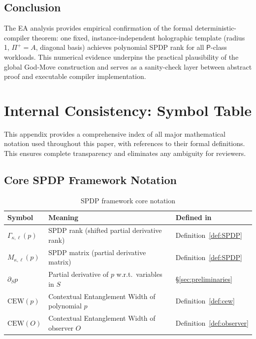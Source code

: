 \documentclass[12pt]{article}
\theoremstyle{definition}
\theoremstyle{definition}
\theoremstyle{remark}
\theoremstyle{remark}
\begin{document}
\subsection{Conclusion}

The EA analysis provides empirical confirmation of the formal deterministic-compiler theorem: one fixed, instance-independent holographic template (radius 1, $\Pi^+ = A$, diagonal basis) achieves polynomial SPDP rank for all $\mathsf{P}$-class workloads. This numerical evidence underpins the practical plausibility of the global God-Move construction and serves as a sanity-check layer between abstract proof and executable compiler implementation.


\section{Internal Consistency: Symbol Table}
\label{sec:symbol-table}

This appendix provides a comprehensive index of all major mathematical notation used throughout this paper, with references to their formal definitions. This ensures complete transparency and eliminates any ambiguity for reviewers.

\subsection{Core SPDP Framework Notation}

\begin{table}[h]
\centering
\begin{tabular}{lp{6cm}l}
\hline
\textbf{Symbol} & \textbf{Meaning} & \textbf{Defined in} \\
\hline
$\Gamma_{\kappa,\ell}(p)$ & SPDP rank (shifted partial derivative rank) & Definition~\ref{def:SPDP} \\
$M_{\kappa,\ell}(p)$ & SPDP matrix (partial derivative matrix) & Definition~\ref{def:SPDP} \\
$\partial_S p$ & Partial derivative of $p$ w.r.t.\ variables in $S$ & \S\ref{sec:preliminaries} \\
$\mathrm{CEW}(p)$ & Contextual Entanglement Width of polynomial $p$ & Definition~\ref{def:cew} \\
$\mathrm{CEW}(O)$ & Contextual Entanglement Width of observer $O$ & Definition~\ref{def:observer} \\
\hline
\end{tabular}
\caption{SPDP framework core notation}
\label{tab:spdp-notation}
\end{table}
\end{document}
